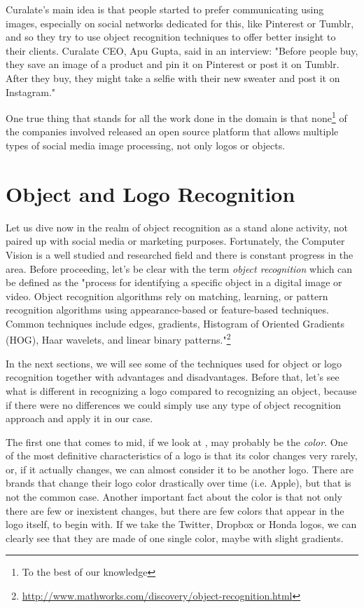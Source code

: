 Curalate's main idea is that people started to prefer communicating using
images, especially on social networks dedicated for this, like Pinterest or
Tumblr, and so they try to use object recognition techniques to offer better
insight to their clients. Curalate CEO, Apu Gupta, said in an interview:
"Before people buy, they save an image of a product and pin it on Pinterest
or post it on Tumblr. After they buy, they might take a selfie with their new
sweater and post it on Instagram."

One true thing that stands for all the work done in the domain is that
none\footnote{To the best of our knowledge} of the companies involved released
an open source platform that allows multiple types of social media image
processing, not only logos or objects.

\section{Object and Logo Recognition}

Let us dive now in the realm of object recognition as a stand alone activity,
not paired up with social media or marketing purposes. Fortunately, the
Computer Vision is a well studied and researched field and there is constant
progress in the area. Before proceeding, let's be clear with the term
\textit{object recognition} which can be defined as the "process for
identifying a specific object in a digital image or video. Object recognition
algorithms rely on matching, learning, or pattern recognition algorithms using
appearance-based or feature-based techniques. Common techniques include edges,
gradients, Histogram of Oriented Gradients (HOG), Haar wavelets, and linear
binary patterns."\footnote{\url{http://www.mathworks.com/discovery/object-recognition.html}}

In the next sections, we will see some of the techniques used for object or
logo recognition together with advantages and disadvantages. Before that,
let's see what is different in recognizing a logo compared to recognizing an
object, because if there were no differences we could simply use any type of
object recognition approach and apply it in our case. 

The first one that comes to mid, if we look at
, may probably be the \textit{color}. One of the most
definitive characteristics of a logo is that its color changes very rarely,
or, if it actually changes, we can almost consider it to be another logo. There are
brands that change their logo color drastically over time (i.e. Apple), but
that is not the common case. Another important fact about the color is that
not only there are few or inexistent changes, but there are few colors that
appear in the logo itself, to begin with. If we take the Twitter, Dropbox or
Honda logos, we can clearly see that they are made of one single color, maybe
with slight gradients.

